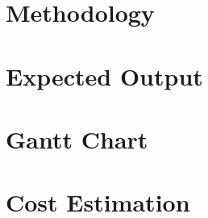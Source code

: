 \documentclass[12pt,a4paper]{report}
\begin{document}
\chapter{Methodology}
\label{methodology}


\chapter{Expected Output}
\label{result}


\chapter*{Gantt Chart}
\label{ganttchart}


\chapter*{Cost Estimation}
\label{cost estimation}


\end{document}
